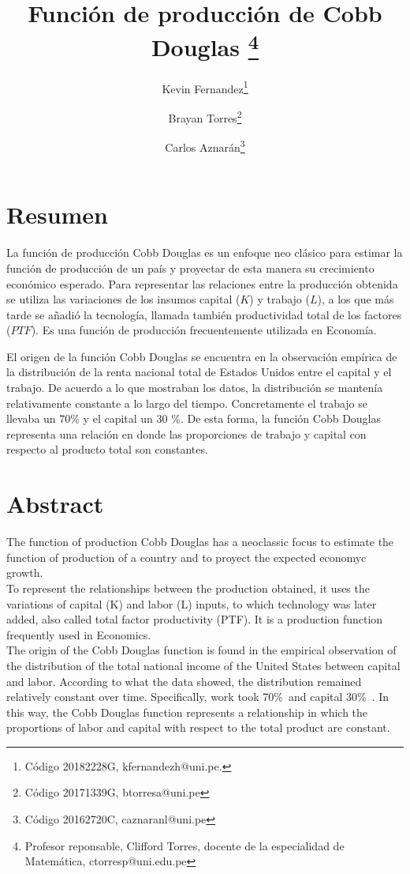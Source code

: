 \documentclass[11pt]{article}
\title{Función de producción de Cobb Douglas \footnote{Profesor reponsable, Clifford Torres, docente de la especialidad de Matemática, ctorresp@uni.edu.pe}}
\author{Kevin Fernandez\footnote{Código 20182228G, kfernandezh@uni.pe.}\and Brayan Torres\footnote{Código 20171339G, btorresa@uni.pe} \and Carlos Aznarán\footnote{Código 20162720C, caznaranl@uni.pe}
}
\date{}
\begin{document}
\maketitle


\section{Resumen} %

La función de producción Cobb Douglas es un enfoque neo clásico para estimar la función de producción de un país y proyectar de esta manera su crecimiento económico esperado. Para representar las relaciones entre la producción obtenida se utiliza las variaciones de los insumos capital ($K$) y trabajo ($L$), a los que más tarde se añadió la tecnología, llamada también productividad total de los factores ($PTF$). Es una función de producción frecuentemente utilizada en Economía.

El origen de la función Cobb Douglas se encuentra en la observación empírica de la distribución de la renta nacional total de Estados Unidos entre el capital y el trabajo. De acuerdo a lo que mostraban los datos, la distribución se mantenía relativamente constante a lo largo del tiempo. Concretamente el trabajo se llevaba un 70\% y el capital un 30 \%. De esta forma, la función Cobb Douglas representa una relación en donde las proporciones de trabajo y capital con respecto al producto total son constantes.

\section{Abstract}
The function of production Cobb Douglas has a neoclassic focus to estimate the function of production of a country and to proyect the expected economyc growth.\\To represent the relationships between the production obtained, it uses the variations of capital (K) and labor (L) inputs, to which technology was later added, also called total factor productivity (PTF). It is a production function frequently used in Economics.\\
The origin of the Cobb Douglas function is found in the empirical observation of the distribution of the total national income of the United States between capital and labor. According to what the data showed, the distribution remained relatively constant over time. Specifically, work took 70\%\ and capital 30\%\ . In this way, the Cobb Douglas function represents a relationship in which the proportions of labor and capital with respect to the total product are constant.
\end{document}
